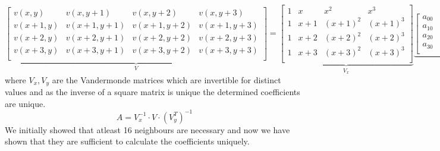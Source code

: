 \documentclass[a4paper, landscape]{article}
\begin{document}
\begin{equation}
    \underbrace{
    \begin{bmatrix}
        v(x,y) & v(x,y+1) & v(x,y+2) & v(x,y+3)\\
        v(x+1,y) & v(x+1,y+1) & v(x+1,y+2) & v(x+1,y+3)\\
        v(x+2,y) & v(x+2,y+1) & v(x+2,y+2) & v(x+2,y+3)\\
        v(x+3,y) & v(x+3,y+1) & v(x+3,y+2) & v(x+3,y+3)\\
    \end{bmatrix}
    }_{V}
    =
    \underbrace{
    \begin{bmatrix}
        1 & x & x^2 & x^3\\
        1 & x+1 & (x+1)^2 & (x+1)^3\\
        1 & x+2 & (x+2)^2 & (x+2)^3\\
        1 & x+3 & (x+3)^2 & (x+3)^3\\
    \end{bmatrix}
    }_{V_x}
    \underbrace{
    \begin{bmatrix}
        a_{00} & a_{01} & a_{02} & a_{03}\\
        a_{10} & a_{11} & a_{12} & a_{13}\\
        a_{20} & a_{21} & a_{22} & a_{23}\\
        a_{30} & a_{31} & a_{32} & a_{33}\\
    \end{bmatrix}
     }_{A}
    \underbrace{
    \begin{bmatrix}
        1 & 1 & 1 & 1 \\ y & y+1 & y+2 & y+3 \\y^2 & (y+1)^2 & (y+2)^2 & (y+3)^2  \\ y^3 & (y+1)^3 & (y+2)^3 & (y+3)^3
    \end{bmatrix}
     }_{V_y^T}
\end{equation}
where $V_x, V_y$ are the Vandermonde matrices which are invertible for distinct values and as the inverse of a square matrix is unique the determined coefficients are unique. 
\begin{equation}
    A = V_x^{-1}\cdot V \cdot (V_y^{T})^{-1}
\end{equation}
We initially showed that atleast 16 neighbours are necessary and now we have shown that they are sufficient to calculate the coefficients uniquely.
\end{document}

